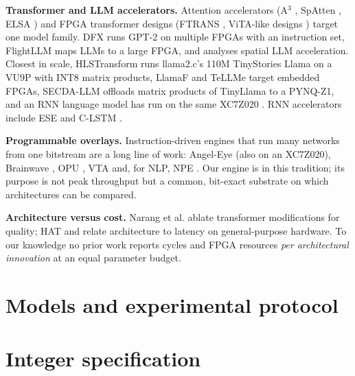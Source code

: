 \documentclass[conference]{IEEEtran}
\begin{document}
\textbf{Transformer and LLM accelerators.} Attention accelerators (A$^3$ \cite{ham2020a3}, SpAtten \cite{wang2021spatten},
ELSA \cite{ham2021elsa}) and FPGA transformer designs (FTRANS \cite{li2020ftrans}, ViTA-like designs
\cite{li2022autovitacc}) target one model family. DFX \cite{hong2022dfx} runs GPT-2 on multiple FPGAs with an instruction
set, FlightLLM \cite{zeng2024flightllm} maps LLMs to a large FPGA, and \cite{chen2025understanding} analyses spatial
LLM acceleration. Closest in scale, HLSTransform \cite{he2024hlstransform} runs llama2.c's 110M TinyStories Llama on a VU9P
with INT8 matrix products, LlamaF \cite{xu2024llamaf} and TeLLMe \cite{qiao2026tellme} target embedded FPGAs, SECDA-LLM
\cite{haris2024secdallm} offloads matrix products of TinyLlama to a PYNQ-Z1, and an RNN language model has run on the same
XC7Z020 \cite{hao2017drnn}. RNN accelerators include ESE \cite{han2017ese} and C-LSTM \cite{wang2018clstm}.

\textbf{Programmable overlays.} Instruction-driven engines that run many networks from one bitstream are a long line of
work: Angel-Eye \cite{guo2018angeleye} (also on an XC7Z020), Brainwave \cite{fowers2018brainwave}, OPU \cite{yu2020opu},
VTA \cite{moreau2019vta} and, for NLP, NPE \cite{khan2021npe}. Our engine is in this tradition; its purpose is not peak
throughput but a common, bit-exact substrate on which architectures can be compared.

\textbf{Architecture versus cost.} Narang et al. \cite{narang2021transformer} ablate transformer modifications for quality;
HAT \cite{wang2020hat} and \cite{kim2023fullstack} relate architecture to latency on general-purpose hardware. To our
knowledge no prior work reports cycles and FPGA resources \emph{per architectural innovation} at an equal parameter budget.

\section{Models and experimental protocol}\label{sec:models}


\section{Integer specification}\label{sec:int}

\end{document}
